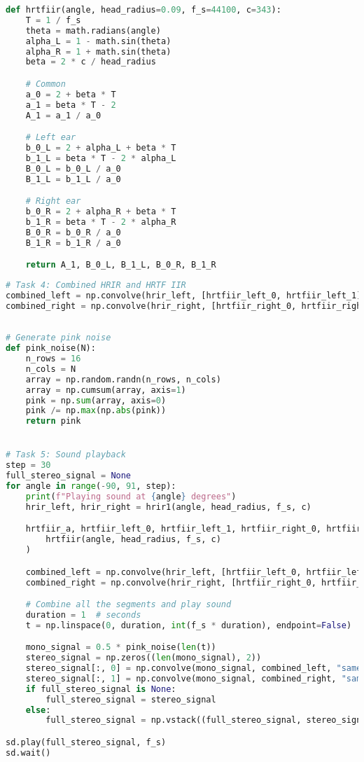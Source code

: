 \begin{lstlisting}[language=Python, caption={hrtfiir.py}, label={lst:hrtfirr}]
def hrtfiir(angle, head_radius=0.09, f_s=44100, c=343):
    T = 1 / f_s
    theta = math.radians(angle)
    alpha_L = 1 - math.sin(theta)
    alpha_R = 1 + math.sin(theta)
    beta = 2 * c / head_radius

    # Common
    a_0 = 2 + beta * T
    a_1 = beta * T - 2
    A_1 = a_1 / a_0

    # Left ear
    b_0_L = 2 + alpha_L + beta * T
    b_1_L = beta * T - 2 * alpha_L
    B_0_L = b_0_L / a_0
    B_1_L = b_1_L / a_0

    # Right ear
    b_0_R = 2 + alpha_R + beta * T
    b_1_R = beta * T - 2 * alpha_R
    B_0_R = b_0_R / a_0
    B_1_R = b_1_R / a_0

    return A_1, B_0_L, B_1_L, B_0_R, B_1_R

\end{lstlisting}

\begin{lstlisting}[language=Python, caption={main.py}, label={lst:combined}]
# Task 4: Combined HRIR and HRTF IIR
combined_left = np.convolve(hrir_left, [hrtfiir_left_0, hrtfiir_left_1], "full")
combined_right = np.convolve(hrir_right, [hrtfiir_right_0, hrtfiir_right_1], "full")
\end{lstlisting}

\begin{lstlisting}[language=Python, caption={main.py}, label={lst:sound_demo}]

# Generate pink noise
def pink_noise(N):
    n_rows = 16
    n_cols = N
    array = np.random.randn(n_rows, n_cols)
    array = np.cumsum(array, axis=1)
    pink = np.sum(array, axis=0)
    pink /= np.max(np.abs(pink))
    return pink


# Task 5: Sound playback
step = 30
full_stereo_signal = None
for angle in range(-90, 91, step):
    print(f"Playing sound at {angle} degrees")
    hrir_left, hrir_right = hrir1(angle, head_radius, f_s, c)

    hrtfiir_a, hrtfiir_left_0, hrtfiir_left_1, hrtfiir_right_0, hrtfiir_right_1 = (
        hrtfiir(angle, head_radius, f_s, c)
    )

    combined_left = np.convolve(hrir_left, [hrtfiir_left_0, hrtfiir_left_1], "full")
    combined_right = np.convolve(hrir_right, [hrtfiir_right_0, hrtfiir_right_1], "full")

    # Combine all the segments and play sound
    duration = 1  # seconds
    t = np.linspace(0, duration, int(f_s * duration), endpoint=False)

    mono_signal = 0.5 * pink_noise(len(t))
    stereo_signal = np.zeros((len(mono_signal), 2))
    stereo_signal[:, 0] = np.convolve(mono_signal, combined_left, "same")
    stereo_signal[:, 1] = np.convolve(mono_signal, combined_right, "same")
    if full_stereo_signal is None:
        full_stereo_signal = stereo_signal
    else:
        full_stereo_signal = np.vstack((full_stereo_signal, stereo_signal))

sd.play(full_stereo_signal, f_s)
sd.wait()

\end{lstlisting}